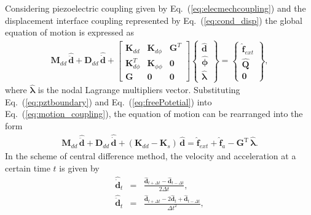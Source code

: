 Considering piezoelectric coupling given by Eq.~(\ref{eq:elecmechcoupling}) and the displacement interface coupling represented by Eq.~(\ref{eq:cond_disp}) the global equation of motion is expressed as
\begin{eqnarray}
	\label{eq:motion_coupling}
	\textbf{M}_{dd}\,\widehat{\ddot{\textbf{d}}} +
	\textbf{D}_{dd}\,\widehat{\dot{\textbf{d}}} +
	\left [\begin{array}{ccc}
		\textbf{K}_{dd}&\textbf{K}_{d\phi}&\textbf{G}^T\\
		\textbf{K}_{d\phi}^T&\textbf{K}_{\phi \phi}&\textbf{0}\\
		\textbf{G}&\textbf{0}&\textbf{0}
	\end{array}\right]
	\left \{\begin{array}{c}
		\widehat{\textbf{d}}\\
		\widehat{\boldsymbol{\phi}}\\
		\widehat{\boldsymbol{\lambda}}
	\end{array}\right\} =
	\left \{\begin{array}{c}
		\widehat{\textbf{f}}_{ext} \\
		\widehat{\textbf{Q}}\\
		\textbf{0}
	\end{array}\right \},
\end{eqnarray}
%
where \(\widehat{\boldsymbol{\lambda}}\) is the nodal Lagrange multipliers vector.
Substituting Eq.~(\ref{eq:pztboundary}) and Eq.~(\ref{eq:freePotetial}) into Eq.~(\ref{eq:motion_coupling}), the equation of motion can be rearranged into the form
\begin{eqnarray}
	\textbf{M}_{dd}\,\widehat{\ddot{\textbf{d}}} + \textbf{D}_{dd} \,\widehat{\dot{\textbf{d}}} + (\textbf{K}_{dd}-\textbf{K}_{s}) \,\widehat{\textbf{d}}  = \widehat{\textbf{f}}_{ext} + \widehat{\textbf{f}}_{a} - \textbf{G}^{\mathrm{T}}\,\widehat{\boldsymbol{\lambda}}.
	\label{eq:motionD}
\end{eqnarray}
In the scheme of central difference method, the velocity and acceleration at a certain time \(t\) is given by
\begin{eqnarray}
	\label{eq:v}
	\widehat{\dot{\textbf{d}}}_{t} & = & \frac{\widehat{\textbf{d}}_{t+\Delta t} - \widehat{\textbf{d}}_{t-\Delta t}}{2\Delta t},\\
	\label{eq:a}
	\widehat{\ddot{\textbf{d}}}_{t} & = & \frac{\widehat{\textbf{d}}_{t+\Delta t} - 2\widehat{\textbf{d}}_{t} + \widehat{\textbf{d}}_{t-\Delta t}}{\Delta t^2},
\end{eqnarray}
